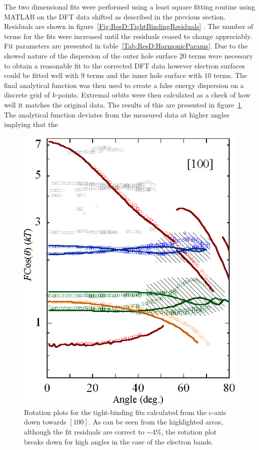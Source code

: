 The two dimensional fits were performed using a least square fitting routine using MATLAB on the DFT data shifted as described in the previous section. Residuals are shown in figure~\ref{Fig:ResD:TightBindingResiduals} . The number of terms for the fits were increased until the residuals ceased to change appreciably. Fit parameters are presented in table~\ref{Tab:ResD:HarmonicParams}. Due to the skewed nature of the \kz dispersion of the outer hole surface $20$ terms were necessary to obtain a reasonable fit to the corrected DFT data however electron surfaces could be fitted well with $9$ terms and the inner hole surface with $10$ terms. The final analytical function was then used to create a false energy dispersion on a discrete grid of $k$-points. Extremal orbits were then calculated as a check of how well it matches the original data. The results of this are presented in figure~\ref{Fig:ResD:TightBindingFitRotationPlot}. The analytical function deviates from the measured data at higher angles implying that the 
\begin{figure}[htbp]
    \begin{center}
        \includegraphics[scale=0.9]{Chapter-dHvABaFe2P2/Figures/AngleDepMeasurements/TightBindingFits/TightBindingFits}
        \caption{Rotation plots for the tight-binding fits calculated from the c-axis down towards $[100]$. As can be seen from the highlighted areas, although the fit residuals are correct to $\sim4\%$, the rotation plot breaks down for high angles in the case of the electron bands.}
        \label{Fig:ResD:TightBindingFitRotationPlot}
    \end{center}
\end{figure}

